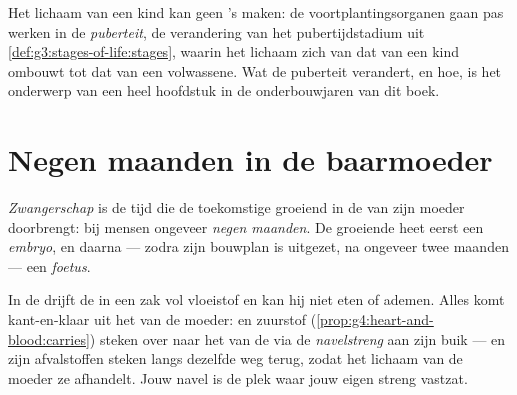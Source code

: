 \begin{remark}\label{rem:g5:human-reproduction:adults}
Het lichaam van een kind kan geen 's maken: de
voortplantingsorganen gaan pas werken in de \emph{puberteit}, de
verandering van het pubertijdstadium uit
\cref{def:g3:stages-of-life:stages}, waarin het lichaam zich van dat van
een kind ombouwt tot dat van een volwassene. Wat de puberteit verandert,
en hoe, is het onderwerp van een heel hoofdstuk in de onderbouwjaren van
dit boek.
\end{remark}

\section{Negen maanden in de baarmoeder}

\begin{definition}[Zwangerschap]\label{def:g5:human-reproduction:pregnancy}
\emph{Zwangerschap} is de tijd die de toekomstige
 groeiend in de  van zijn moeder doorbrengt: bij mensen
ongeveer \emph{negen maanden}. De groeiende  heet eerst een
\emph{embryo}, en daarna --- zodra zijn bouwplan is
uitgezet, na ongeveer twee maanden --- een \emph{foetus}.
\end{definition}

\begin{proposition}\label{prop:g5:human-reproduction:cord}
In de  drijft de  in een zak vol vloeistof en kan hij niet
eten of ademen. Alles komt kant-en-klaar uit het  van de moeder:
 en zuurstof
(\cref{prop:g4:heart-and-blood:carries}) steken over naar het  van
de  via de \emph{navelstreng} aan zijn buik ---
en zijn afvalstoffen steken langs dezelfde weg terug, zodat het lichaam
van de moeder ze afhandelt. Jouw navel is de plek waar jouw eigen streng
vastzat.
\end{proposition}
\admitted

